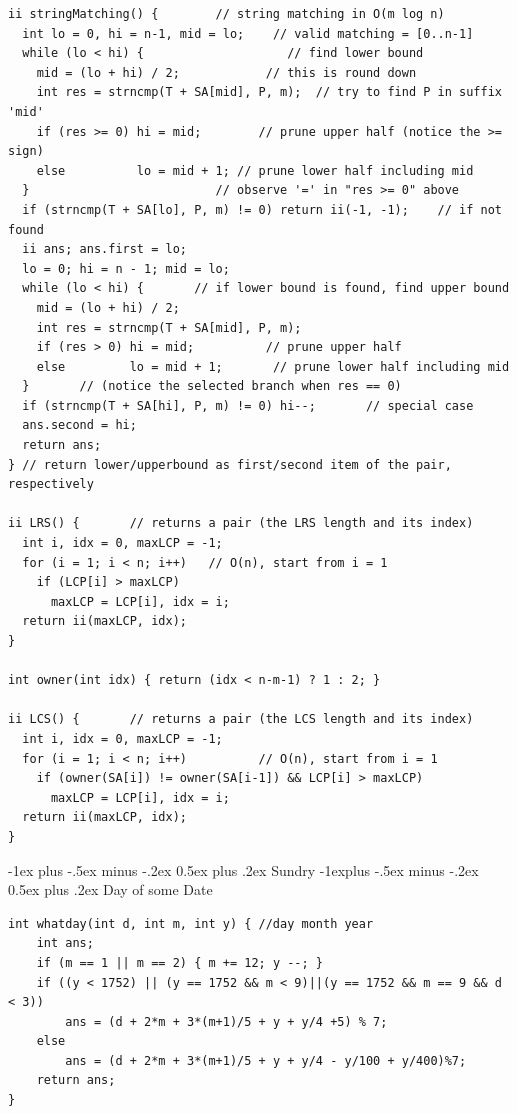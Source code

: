 \documentclass[10pt,landscape]{article}
\makeatletter
\renewcommand{\section}{\@startsection{section}{1}{0mm}%
                                {-1ex plus -.5ex minus -.2ex}%
                                {0.5ex plus .2ex}%
                                {\normalfont\large\bfseries}}
\renewcommand{\subsection}{\@startsection{subsection}{2}{0mm}%
                                {-1explus -.5ex minus -.2ex}%
                                {0.5ex plus .2ex}%
                                {\normalfont\normalsize\bfseries}}
\makeatother
\begin{document}
\begin{multicols}{2}
\begin{lstlisting}
ii stringMatching() {        // string matching in O(m log n)
  int lo = 0, hi = n-1, mid = lo;    // valid matching = [0..n-1]
  while (lo < hi) {                    // find lower bound
    mid = (lo + hi) / 2;            // this is round down
    int res = strncmp(T + SA[mid], P, m);  // try to find P in suffix 'mid'
    if (res >= 0) hi = mid;        // prune upper half (notice the >= sign)
    else          lo = mid + 1; // prune lower half including mid
  }                          // observe '=' in "res >= 0" above
  if (strncmp(T + SA[lo], P, m) != 0) return ii(-1, -1);    // if not found
  ii ans; ans.first = lo;
  lo = 0; hi = n - 1; mid = lo;
  while (lo < hi) {       // if lower bound is found, find upper bound
    mid = (lo + hi) / 2;
    int res = strncmp(T + SA[mid], P, m);
    if (res > 0) hi = mid;          // prune upper half
    else         lo = mid + 1;       // prune lower half including mid
  }       // (notice the selected branch when res == 0)
  if (strncmp(T + SA[hi], P, m) != 0) hi--;       // special case
  ans.second = hi;
  return ans;
} // return lower/upperbound as first/second item of the pair, respectively

ii LRS() {       // returns a pair (the LRS length and its index)
  int i, idx = 0, maxLCP = -1;
  for (i = 1; i < n; i++)   // O(n), start from i = 1
    if (LCP[i] > maxLCP)
      maxLCP = LCP[i], idx = i;
  return ii(maxLCP, idx);
}

int owner(int idx) { return (idx < n-m-1) ? 1 : 2; }

ii LCS() {       // returns a pair (the LCS length and its index)
  int i, idx = 0, maxLCP = -1;
  for (i = 1; i < n; i++)          // O(n), start from i = 1
    if (owner(SA[i]) != owner(SA[i-1]) && LCP[i] > maxLCP)
      maxLCP = LCP[i], idx = i;
  return ii(maxLCP, idx);
}
\end{lstlisting}

\section{Sundry}
\subsection{Day of some Date}
\begin{lstlisting}
int whatday(int d, int m, int y) { //day month year
    int ans;
    if (m == 1 || m == 2) { m += 12; y --; }
    if ((y < 1752) || (y == 1752 && m < 9)||(y == 1752 && m == 9 && d < 3))
        ans = (d + 2*m + 3*(m+1)/5 + y + y/4 +5) % 7;
    else
        ans = (d + 2*m + 3*(m+1)/5 + y + y/4 - y/100 + y/400)%7;
    return ans;
}
\end{lstlisting}

\end{multicols}
\end{document}
